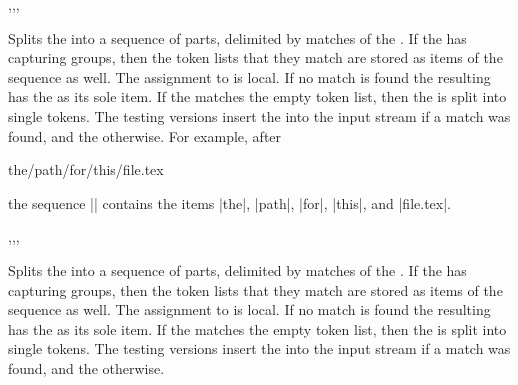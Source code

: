 \documentclass[oneside]{book}
\begin{document}
\begin{function}{\regexSplit,\regexSplitT,\regexSplitF,\regexSplitTF}
\begin{syntax}
   
    
    
     
\end{syntax}
Splits the  into a sequence of parts, delimited by
matches of the . If the 
has capturing groups, then the token lists that they match are stored as
items of the sequence as well. The assignment to  is local.
If no match is found the resulting  has the
 as its sole item. If the 
matches the empty token list, then the  is split
into single tokens.
The testing versions insert the  into the input
stream if a match was found, and the  otherwise.
For example, after
\begin{codehigh}
\seqNew \lPathSeq
\regexSplit {/} {the/path/for/this/file.tex} \lPathSeq
\end{codehigh}
the sequence |\lPathSeq| contains the items |{the}|, |{path}|,
|{for}|, |{this}|, and |{file.tex}|.
\end{function}

\begin{function}{\regexVarSplit,\regexVarSplitT,\regexVarSplitF,\regexVarSplitTF}
\begin{syntax}
   
    
    
     
\end{syntax}
Splits the  into a sequence of parts, delimited by
matches of the . If the 
has capturing groups, then the token lists that they match are stored as
items of the sequence as well. The assignment to  is local.
If no match is found the resulting  has the
 as its sole item. If the 
matches the empty token list, then the  is split
into single tokens.
The testing versions insert the  into the input
stream if a match was found, and the  otherwise.
\end{function}
\end{document}
